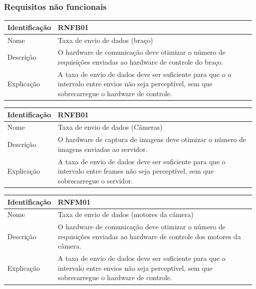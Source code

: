 	\subsubsection{Requisitos não funcionais}\label{subsec-req-nfunc}
		\begin{center}
	\begin{tabular}{ | l |  p{7cm} |}
		\hline
		Identificação & RNFB01  \\ \hline
		Nome & Taxa de envio de dados (braço)\\ \hline
		Descrição & O hardware de comunicação deve otimizar o número de requisições enviadas ao hardware de controle do braço.
		\\ \hline
		Explicação &  A taxa de envio de dados deve ser suficiente para que o o intervalo entre envios não seja perceptível, sem que sobrecarregue o hardware de controle.
		\\ \hline
		
	\end{tabular}
\end{center}	
		\begin{center}
	\begin{tabular}{ | l |  p{7cm} |}
		\hline
		Identificação & RNFB01  \\ \hline
		Nome & Taxa de envio de dados (Câmeras)\\ \hline
		Descrição & O hardware de captura de imagens deve otimizar o número de imagens enviadas ao servidor.
		\\ \hline
		Explicação &  A taxa de envio de dados deve ser suficiente para que o intervalo entre frames não seja perceptível, sem que sobrecarregue o servidor.
		\\ \hline
		
	\end{tabular}
\end{center}
	
		\begin{center}
		\begin{tabular}{ | l |  p{7cm} |}
			\hline
			Identificação & RNFM01  \\ \hline
			Nome & Taxa de envio de dados (motores da câmera)\\ \hline
			Descrição & O hardware de comunicação deve otimizar o número de requisições enviadas ao hardware de controle dos motores da câmera.
			\\ \hline
			Explicação &  A taxa de envio de dados deve ser  suficiente para que o intervalo entre envios não seja perceptível, sem que sobrecarregue o hardware de controle.
			\\ \hline
			
		\end{tabular}
	\end{center}


